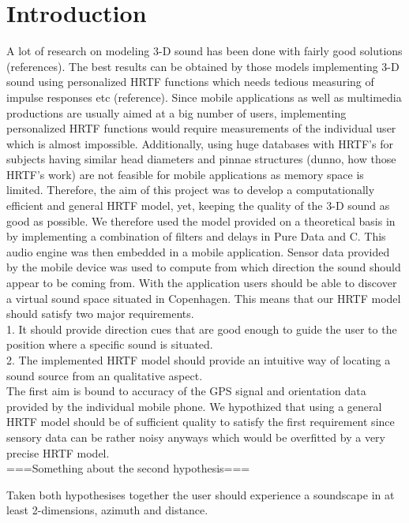 \documentclass[journal]{IEEEtran}
\begin{document}
\section{Introduction}



A lot of research on modeling 3-D sound has been done with fairly good solutions (references). The best results can be obtained by those models implementing 3-D sound using personalized HRTF functions which needs tedious measuring of impulse responses etc (reference). Since mobile applications as well as multimedia productions are usually aimed at a big number of users, implementing personalized HRTF functions would require measurements of the individual user which is almost impossible. Additionally, using huge databases with HRTF's for subjects having similar head diameters and pinnae structures (dunno, how those HRTF's work) are not feasible for mobile applications as memory space is limited. Therefore, the aim of this project was to develop a computationally efficient and general HRTF model, yet, keeping the quality of the 3-D sound as good as possible. We therefore used the model provided on a theoretical basis in~\cite{Brown1997} by implementing a combination of filters and delays in Pure Data and C. This audio engine was then embedded in a mobile application. Sensor data provided by the mobile device was used to compute from which direction the sound should appear to be coming from. With the application users should be able to discover a virtual sound space situated in Copenhagen. This means that our HRTF model should satisfy two major requirements. 
\\1. It should provide direction cues that are good enough to guide the user to the position where a specific sound is situated.\\2. The implemented HRTF model should provide an intuitive way of locating a sound source from an qualitative aspect. \\The first aim is bound to accuracy of the GPS signal and orientation data provided by the individual mobile phone. We hypothized that using a general HRTF model should be of sufficient quality to satisfy the first requirement since sensory data can be rather noisy anyways which would be overfitted by a very precise HRTF model.\\ ===Something about the second hypothesis===

Taken both hypothesises together the user should experience a soundscape in at least 2-dimensions, azimuth and distance.
\end{document}
